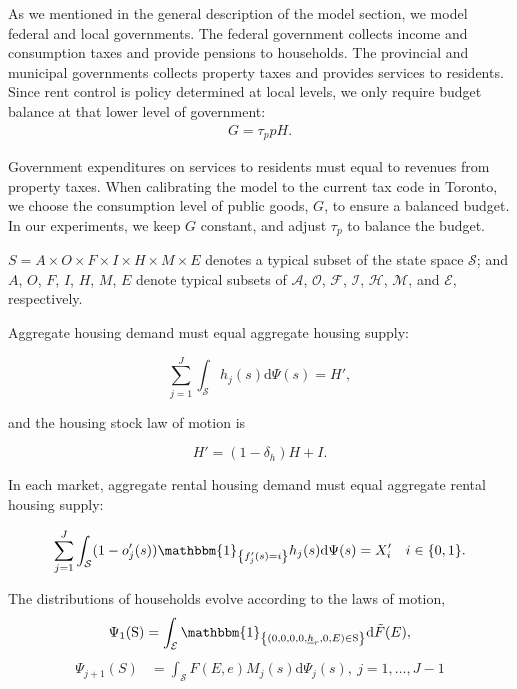 \documentclass[parskip=full]{article}
\newcommand{\indicator}[1]{\mathbbm{1}_{\left\{ {#1} \right\} }}
\begin{document}
As we mentioned in the general description of the model section, we model federal and local governments. The federal government collects income and consumption taxes and provide pensions to households. The provincial and municipal governments collects property taxes and provides services to residents. Since rent control is policy determined at local levels, we only require budget balance at that lower level of government:
\begin{align}\label{eq:gbc}
  G  = \tau_{p} p H.
\end{align}

\noindent Government expenditures on services to residents must equal to revenues from property taxes. When calibrating the model to the current tax code in Toronto, we choose the consumption level of public goods, $G$, to ensure a balanced budget. In our experiments, we keep $G$ constant, and adjust $\tau_{p}$ to balance the budget. 

$S=A\times O \times F \times I \times H\times M\times E$ denotes a typical subset of the state space $\mathcal{S}$; and $A$, $O$, $F$, $I$, $H$, $M$, $E$ denote typical subsets of $\mathcal{A}$, $\mathcal{O}$, $\mathcal{F}$, $\mathcal{I}$, $\mathcal{H}$, $\mathcal{M}$, and $\mathcal{E}$, respectively.

Aggregate housing demand must equal aggregate housing supply:

\begin{equation}
\label{eq:housing_clearing_condition}
  \sum_{j=1}^J \int_\mathcal{S} h_{j}(s) \mathrm{d}\Psi(s) = H',
\end{equation}

\noindent and the housing stock law of motion is 

\begin{equation}\label{eq:housing_stock_lom}
H'=(1-\delta_h)H + I.
\end{equation}

\noindent In each market, aggregate rental housing demand must equal aggregate rental housing supply:

\begin{equation}
\label{eq:rental_housing_clearing_condition}
  \sum_{j=1}^J \int_\mathcal{S} (1-o'_{j}(s))\indicator{f'_{j}(s)=i}h_{j}(s) \mathrm{d}\Psi(s) = X'_{i} \quad i \in \{0,1\}.
\end{equation}

The distributions of households evolve according to the laws of motion,
\begin{align}
\Psi_{1}(\mathrm{S})=\int_{\mathcal{E}}\indicator{(0,0,0,0,\underline{h}_{r},0,E)\in \mathrm{S}}\mathrm{d} \tilde{F}(E),\label{eq:lom2}
\end{align}
\begin{align}
\Psi_{j+1}(S) &=\int_{\mathcal{S}} F(E,e)M_{j}(s)\mathrm{d}\Psi_{j}(s),\ j=1,\ldots,J-1\label{eq:lom1}
\end{align}
\end{document}
